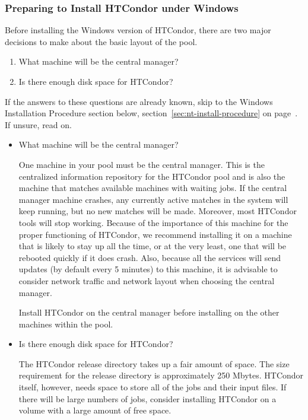\subsubsection{\label{sec:NT-Preparing-to-Install}Preparing to Install
HTCondor under Windows } 

Before installing the Windows version of HTCondor,
there are two major
decisions to make about the basic layout of the pool.

\begin{enumerate}
\item What machine will be the central manager?
\item Is there enough disk space for HTCondor?
\end{enumerate}

If the answers to these questions are already known,
skip to the Windows Installation Procedure section below,
section~\ref{sec:nt-install-procedure} on
page~\pageref{sec:nt-install-procedure}.
If unsure, read on.

\begin{itemize} 

\item{What machine will be the central manager?}

One machine in your pool must be the central manager.
This is the
centralized information repository for the HTCondor pool and is also the
machine that matches available machines with waiting
jobs.  If the central manager machine crashes, any currently active
matches in the system will keep running, but no new matches will be
made.  Moreover, most HTCondor tools will stop working.  Because of the
importance of this machine for the proper functioning of HTCondor, we
recommend installing it on a machine that is likely to stay up all the
time, or at the very least, one that will be rebooted quickly if it
does crash.  Also, because all the services will send updates (by
default every 5 minutes) to this machine, it is advisable to consider
network traffic and network layout when choosing the central
manager.

Install HTCondor on the central manager before installing
on the other machines within the pool.

\item{Is there enough disk space for HTCondor?}

The HTCondor release directory takes up a fair amount of space.
The size requirement for the release
directory is approximately 250 Mbytes.
HTCondor itself, however, needs space to store all of the jobs and their
input files.  If there will be large numbers of jobs,
consider installing HTCondor on a volume with a large amount
of free space.

\end{itemize}


